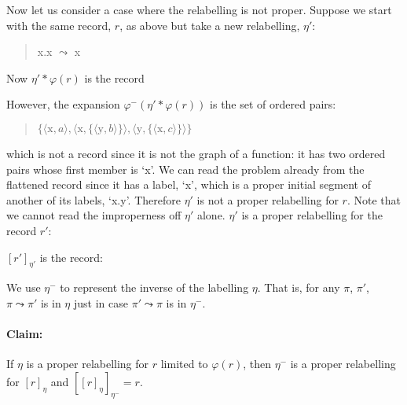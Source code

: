 Now let us consider a case where the relabelling is not proper.
Suppose we start with the same record, $r$, as above but take a new
relabelling, $\eta'$:
\begin{quote}
x.x $\leadsto$ x
\end{quote}
Now $\eta'*\varphi(r)$ is the record
\begin{quote}
\end{quote}
However, the expansion $\varphi^-(\eta'*\varphi(r))$ is the set of
ordered pairs:
\begin{quote}
$\{\langle\mathrm{x},a\rangle,
   \langle\mathrm{x},\{\langle\mathrm{y},b\rangle\}\rangle,
   \langle\mathrm{y},\{\langle\mathrm{x},c\rangle\}\rangle\}$
\end{quote}
which is not a record since it is not the graph of a function:  it has
two ordered pairs whose first member is `x'.  We can read the problem
already from the flattened record since it has a label, `x', which is a
proper initial segment of another of its labels, `x.y'.  Therefore
$\eta'$ is not a proper relabelling for $r$.  Note that we cannot read
the improperness off $\eta'$ alone.  $\eta'$ is a proper relabelling
for the record $r'$:
\begin{quote}
\end{quote}
$[r']_{\eta'}$ is the record:
\begin{quote}
\end{quote}



We use $\eta^-$ to represent the inverse of the labelling $\eta$.
That is, for any $\pi$, $\pi'$, $\pi\leadsto\pi'$ is in $\eta$ just in
case $\pi'\leadsto\pi$ is in $\eta^-$. 
\paragraph{Claim:} If
$\eta$ is a proper relabelling for $r$ limited to $\varphi(r)$, then $\eta^-$ is a proper
relabelling for $[r]_\eta$ and $[[r]_\eta]_{\eta^-}=r$.  

